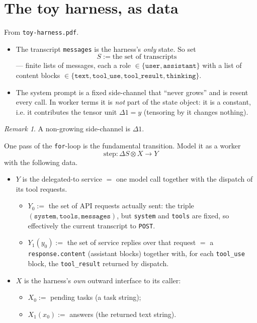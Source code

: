 \documentclass[11pt]{article}
\theoremstyle{plain}
\theoremstyle{definition}
\theoremstyle{remark}
\newtheorem{remark}{Remark}
\newcommand{\state}{\Delta}
\begin{document}
\section{The toy harness, as data}

From \texttt{toy-harness.pdf}.

\begin{itemize}
  \item The transcript \texttt{messages} is the harness's \emph{only} state. So set
  \[
    S := \text{the set of transcripts}
  \]
  --- finite lists of messages, each a role $\in \{\texttt{user},\texttt{assistant}\}$ with
  a list of content blocks $\in \{\texttt{text},\texttt{tool\_use},\texttt{tool\_result},\texttt{thinking}\}$.

  \item The system prompt is a fixed side-channel that ``never grows'' and is resent every
  call. In worker terms it is \emph{not} part of the state object: it is a constant, i.e. it
  contributes the tensor unit $\state 1 = y$ (tensoring by it changes nothing).
\end{itemize}

\begin{remark}
A non-growing side-channel is $\state 1$.
\end{remark}

One pass of the \texttt{for}-loop is the fundamental transition. Model it as a worker
\[
  \mathrm{step} : \state S \otimes X \longrightarrow Y
\]
with the following data.

\begin{itemize}
  \item $Y$ is the delegated-to service $=$ one model call together with the dispatch of its
  tool requests.
  \begin{itemize}
    \item $Y_0 :=$ the set of API requests actually sent: the triple
    $(\texttt{system},\texttt{tools},\texttt{messages})$, but \texttt{system} and
    \texttt{tools} are fixed, so effectively the current transcript to \texttt{POST}.
    \item $Y_1(y_0) :=$ the set of service replies over that request $=$ a
    \texttt{response.content} (assistant blocks) together with, for each \texttt{tool\_use}
    block, the \texttt{tool\_result} returned by dispatch.
  \end{itemize}

  \item $X$ is the harness's \emph{own} outward interface to its caller:
  \begin{itemize}
    \item $X_0 :=$ pending tasks (a task string);
    \item $X_1(x_0) :=$ answers (the returned text string).
  \end{itemize}
\end{itemize}
\end{document}
